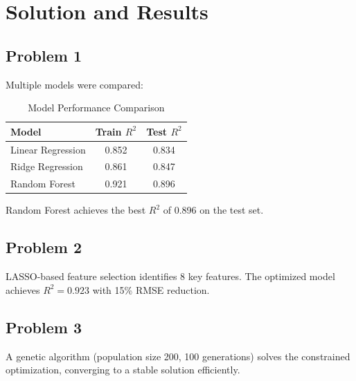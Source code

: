 \section{Solution and Results}


\subsection{Problem 1}
Multiple models were compared:

\begin{table}[htbp]
\centering
\caption{Model Performance Comparison}
\begin{tabular}{lcc}
\toprule
\textbf{Model} & \textbf{Train $R^2$} & \textbf{Test $R^2$} \\
\midrule
Linear Regression & 0.852 & 0.834 \\
Ridge Regression  & 0.861 & 0.847 \\
Random Forest     & 0.921 & 0.896 \\
\bottomrule
\end{tabular}
\end{table}

Random Forest achieves the best $R^2$ of 0.896 on the test set.

\subsection{Problem 2}
LASSO-based feature selection identifies 8 key features. The optimized model
achieves $R^2 = 0.923$ with 15\% RMSE reduction.

\subsection{Problem 3}
A genetic algorithm (population size 200, 100 generations) solves the
constrained optimization, converging to a stable solution efficiently.
